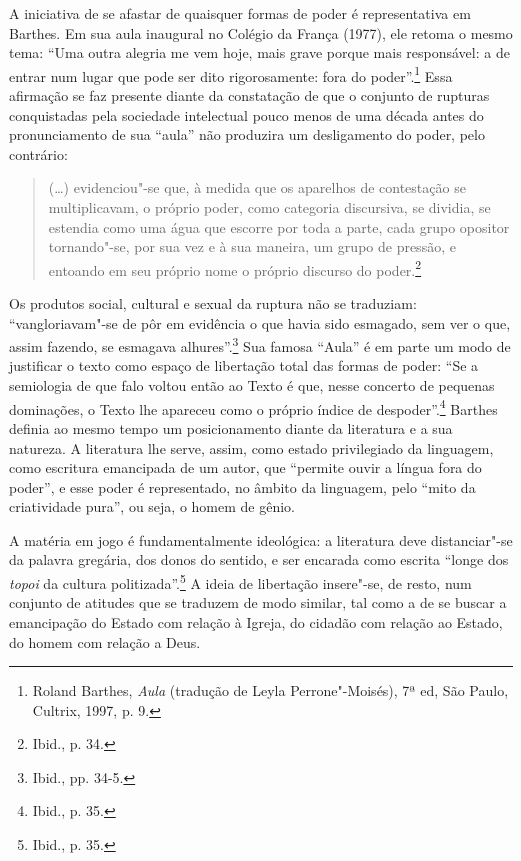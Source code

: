 A iniciativa de se afastar de quaisquer formas de poder é representativa
em Barthes. Em sua aula inaugural no Colégio da França (1977), ele
retoma o mesmo tema: ``Uma outra alegria me vem hoje, mais grave porque
mais responsável: a de entrar num lugar que pode ser dito rigorosamente:
fora do poder''.\footnote{Roland Barthes, \emph{Aula} (tradução de Leyla
  Perrone"-Moisés), 7ª ed, São Paulo, Cultrix, 1997, p.
  9.} Essa afirmação se faz presente diante da constatação de que o
conjunto de rupturas conquistadas pela sociedade intelectual pouco menos
de uma década antes do pronunciamento de sua ``aula'' não produzira um
desligamento do poder, pelo contrário:

\begin{quote}
(\ldots{}) evidenciou"-se que, à medida que os aparelhos de contestação se
multiplicavam, o próprio poder, como categoria discursiva, se dividia,
se estendia como uma água que escorre por toda a parte, cada grupo
opositor tornando"-se, por sua vez e à sua maneira, um grupo de pressão,
e entoando em seu próprio nome o próprio discurso do poder.\footnote{Ibid.,
  p. 34.}
\end{quote}

Os produtos social, cultural e sexual da ruptura não se traduziam:
``vangloriavam"-se de pôr em evidência o que havia sido esmagado, sem ver
o que, assim fazendo, se esmagava alhures''.\footnote{Ibid., pp. 34-5.}
Sua famosa ``Aula'' é em parte um modo de justificar o texto como espaço
de libertação total das formas de poder: ``Se a semiologia de que falo
voltou então ao Texto é que, nesse concerto de pequenas dominações, o
Texto lhe apareceu como o próprio índice de despoder''.\footnote{Ibid.,
  p. 35.} Barthes definia ao mesmo tempo um posicionamento diante da
literatura e a sua natureza. A literatura lhe serve, assim, como estado
privilegiado da linguagem, como escritura emancipada de um autor, que
``permite ouvir a língua fora do poder'', e esse poder é representado,
no âmbito da linguagem, pelo ``mito da criatividade pura'', ou seja, o
homem de gênio.

A matéria em jogo é fundamentalmente ideológica: a literatura deve
distanciar"-se da palavra gregária, dos donos do sentido, e ser encarada
como escrita ``longe dos \emph{topoi} da cultura politizada''.\footnote{Ibid.,
  p. 35.} A ideia de libertação insere"-se, de resto, num conjunto de
atitudes que se traduzem de modo similar, tal como a de se buscar a
emancipação do Estado com relação à Igreja, do cidadão com relação ao
Estado, do homem com relação a Deus.

